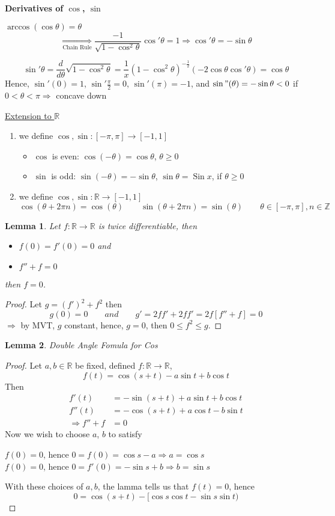 \documentclass[12pt]{article}
\theoremstyle{plain}
\newtheorem{lemma}{Lemma}[subsection]
\newcommand{\mR}{{\mathbb{R}}}
\newcommand{\mZ}{{\mathbb{Z}}}
\DeclareMathOperator{\Sin}{Sin}
\begin{document}
\textbf{Derivatives of $\cos$, $\sin$}

$\arccos (\cos \theta) = \theta$
\[
	\underset{\text{Chain Rule}} {\Rightarrow}
	\frac{-1}{\sqrt{1-\cos^2 \theta}} \cos '\theta=1
	\Rightarrow \cos'\theta = -\sin \theta
\]

\[
	\sin'\theta = \frac d{d\theta} \sqrt{1-\cos^2\theta} 
	= \frac1x(1-\cos^2 \theta) ^{-\frac12} (-2\cos \theta \cos'\theta)
	= \cos \theta
\]
Hence, $\sin'(0)=1$, $\sin'\frac{\pi}2 = 0$, $\sin'(\pi) = -1$, and 
$\sin"(\theta) = -\sin \theta < 0$ if $0<\theta < \pi \Rightarrow$
concave down

\underline{Extension to $\mR$} 
\begin{enumerate}[label=(\alph*)]
	\item we define $\cos, \sin:[-\pi,\pi] \to [-1,1]$
		\begin{itemize}
			\item $\cos$ is even: $\cos (-\theta) = \cos \theta$,
			$\theta \geq 0$
			\item $\sin$ is odd: $\sin(-\theta) = -\sin \theta$, 
				$\sin \theta = \Sin x$, if $\theta \geq 0$ 
		\end{itemize}
	\item we define $\cos, \sin : \mR \to [-1, 1]$
		\[
			\cos(\theta + 2\pi n) = \cos(\theta)
			\qquad 
			\sin (\theta + 2\pi n) = \sin(\theta)
			\qquad 
			\theta \in [-\pi, \pi], n \in \mZ
		\]
\end{enumerate}

\begin{lemma}
	Let $f: \mR \to \mR$ is twice differentiable, then 
	\begin{itemize}
		\item $f(0) = f'(0) = 0$ and 
		\item $f''+f=0$
	\end{itemize}
	then $f=0$. 
\end{lemma}
\begin{proof}
	Let $g=(f')^2 + f^2$ then
	\[
		g(0)=0 \qquad and \qquad 
		g'= 2ff'+ 2ff'=2f[f''+f] = 0
	\]
	$\Rightarrow$ by MVT, $g$ constant, hence, $g=0$, 
	then $0\leq f^2 \leq g$. 
\end{proof}

\begin{lemma}
	Double Angle Fomula for Cos
\end{lemma}
\begin{proof}
	Let $a, b \in \mR$ be fixed, defined $f : \mR \to \mR$, 
	\[
		f(t) = \cos(s+t) - a \sin t + b\cos t
	\]
	Then
	\begin{align*}
		f'(t) & = - \sin (s+t) + a\sin t + b \cos t\\
		f''(t) &= -\cos (s+t) + a\cos t -b\sin t\\
		\Rightarrow f''+f &= 0
	\end{align*}
	Now we wish to choose $a$, $b$ to satisfy
	
	$f(0)=0$, hence $0=f(0)=\cos s - a \Rightarrow a = \cos s$\\
	$f(0)=0$, hence $0=f'(0)=-\sin s + b \Rightarrow b = \sin s$

	With these choices of $a,b$, the lamma tells us that $f(t) = 0$, hence
	\[
		0 = \cos(s+t) - [\cos s \cos t-\sin s \sin t)
	\]
\end{proof}
\end{document}
